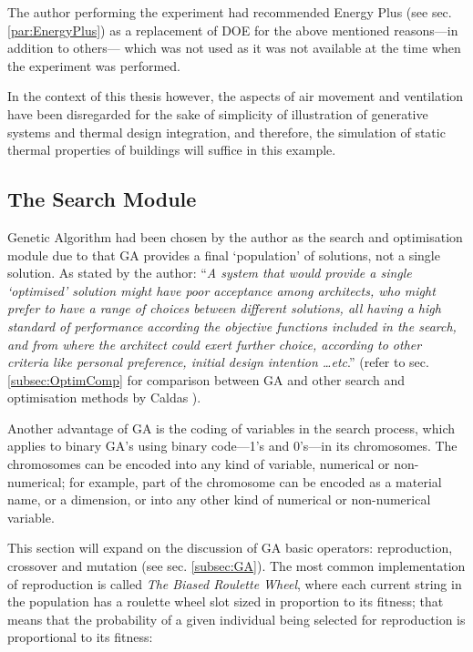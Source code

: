 The author performing the experiment had recommended Energy Plus (see sec. \ref{par:EnergyPlus}) as a replacement of DOE for the above mentioned reasons---in addition to others--- which was not used as it was not available at the time when the experiment was performed.

In the context of this thesis however, the aspects of air movement and ventilation have been disregarded for the sake of simplicity of illustration of generative systems and thermal design integration, and therefore, the simulation of static thermal properties of buildings will suffice in this example.

\subsection{The Search Module}

\label{subsec:GA2}
Genetic Algorithm had been chosen by the author as the search and optimisation module due to that GA provides a final `population' of solutions, not a single solution. As stated by the author: ``\emph{A system that would provide a single `optimised' solution might have poor acceptance among architects, who might prefer to have a range of choices between different solutions, all having a high standard of performance according the objective functions included in the search, and from where the architect could exert further choice, according to other criteria like personal preference, initial design intention \ldots etc}.'' (refer to sec. \ref{subsec:OptimComp} for comparison between GA and other search and optimisation methods by Caldas \cite{caldas01}).

Another advantage of GA is the coding of variables in the search process, which applies to binary GA's using binary code---1's and 0's---in its chromosomes. The chromosomes can be encoded into any kind of variable, numerical or non-numerical; for example, part of the chromosome can be encoded as a material name, or a dimension, or into any other kind of numerical or non-numerical variable.

This section will expand on the discussion of GA basic operators: reproduction, crossover and mutation (see sec. \ref{subsec:GA}). The most common implementation of reproduction is called \emph{The Biased Roulette Wheel}, where each current string in the population has a roulette wheel slot sized in proportion to its fitness; that means that the probability of a given individual being selected for reproduction is proportional to its fitness:

